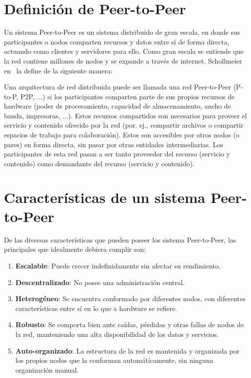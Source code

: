 

\section{Definición de Peer-to-Peer}
\label{sec:p2p_definition}

Un sistema Peer-to-Peer es un sistema distribuido de gran escala, en donde sus participantes o
nodos comparten recursos y datos entre sí de forma directa, actuando como
clientes y servidores para ello. Como gran escala se entiende que la red
contiene millones de nodos y se expande a través de internet. Schollmeier en~\cite{conf_p2p_Schollmeier01} la define de la siguiente manera:

\begin{mydef}
Una arquitectura de red
distribuida puede ser llamada una red Peer-to-Peer (P-to-P, P2P, ...) si los
participantes comparten parte de sus propios recursos de hardware (poder de
procesamiento, capacidad de almacenamiento, ancho de banda, impresoras, ...).
Estos recursos compartidos son necesarios para proveer el servicio y contenido
ofrecido por la red (por. ej., compartir archivos o compartir espacios de
trabajo para colaboración). Estos son accesibles por otros nodos (o pares) en forma
directa, sin pasar por otras entidades intermediarias. Los participantes de
esta red pasan a ser tanto proveedor del recurso (servicio y contenido) como
demandante del recurso (servicio y contenido).
\end{mydef}

\section{Características de un sistema Peer-to-Peer}
\label{sec:p2p_characteristics}

De las diversas características que pueden poseer los sistema Peer-to-Peer, las
principales que idealmente debiera cumplir son:
\begin{enumerate}
    \item \textbf{Escalable}: Puede crecer indefinidamente sin afectar su rendimiento.
    \item \textbf{Descentralizado}: No posee una administración central.
    \item \textbf{Heterogéneo}: Se encuentra conformado por diferentes nodos, con
diferentes características  entre sí en lo que a hardware se refiere. 
    \item \textbf{Robusto}: Se comporta bien ante caídas, pérdidas y otras
fallas de nodos de la red, manteniendo una alta disponibilidad de los datos y
servicios.
    \item \textbf{Auto-organizado}: La estructura de la red es mantenida y
organizada por los propios nodos que la conforman automáticamente, sin ninguna organización manual.
\end{enumerate}

